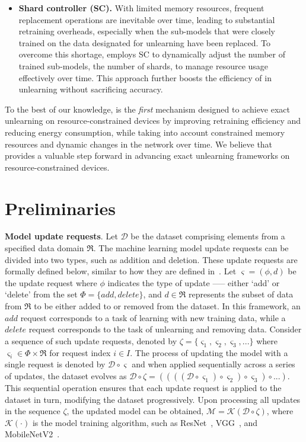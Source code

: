 \documentclass[conference,compsoc]{IEEEtran}
\begin{document}
\begin{itemize}[leftmargin=*,noitemsep]
    \item \textbf{Shard controller (SC).} With limited memory resources, frequent replacement operations are inevitable over time, leading to substantial retraining overheads, especially when the sub-models that were closely trained on the data designated for unlearning have been replaced. To overcome this shortage, \tool employs SC to dynamically adjust the number of trained sub-models, \ie the number of shards, to manage resource usage effectively over time. This approach further boosts the efficiency of \tool in unlearning without sacrificing accuracy.
\end{itemize}

To the best of our knowledge, \tool is the \textit{first} mechanism designed to achieve exact unlearning on resource-constrained devices by improving retraining efficiency and reducing energy consumption, while taking into account constrained memory resources and dynamic changes in the network over time.
We believe that \tool provides a valuable step forward in advancing exact unlearning frameworks on resource-constrained devices.




\section{Preliminaries}

\noindent\textbf{Model update requests}. Let $\mathcal{D}$ be the dataset comprising elements from a specified data domain $\Re$. The machine learning model update requests can be divided into two types, such as addition and deletion. These update requests are formally defined below, similar to how they are defined in~\cite{gupta2021adaptive, neel2021descent}. 
Let $\varsigma = (\phi, d)$ be the update request where $\phi$ indicates the type of update —-- either `add' or `delete' from the set $\Phi = \{add, delete\}$, and $d \in \Re$ represents the subset of data from $\Re$ to be either added to or removed from the dataset. In this framework, an $add$ request corresponds to a task of learning with new training data, while a $delete$ request corresponds to the task of unlearning and removing data. Consider a sequence of such update requests, denoted by $\zeta = \{ \varsigma_1, \varsigma_2, \varsigma_3, ... \}$ where $\varsigma_i \in \Phi \times \Re$ for request index $i \in I$. The process of updating the model with a single request is denoted by $\mathcal{D} \circ \varsigma$ and when applied sequentially across a series of updates, the dataset evolves as  
$\mathcal{D} \circ \zeta = ((((\mathcal{D} \circ \varsigma_1)\circ \varsigma_2)\circ \varsigma_3)\circ ...)$.
This sequential operation ensures that each update request is applied to the dataset in turn, modifying the dataset progressively. Upon processing all updates in the sequence $\zeta$, the updated model can be obtained, \ie $\mathcal{M} = \mathcal{K}(\mathcal{D} \circ \zeta)$, where $\mathcal{K}(\cdot)$ is the model training algorithm, such as ResNet~\cite{he2016deep}, VGG~\cite{simonyan2015very}, and MobileNetV2~\cite{sandler2018mobilenetv2}.
\end{document}
